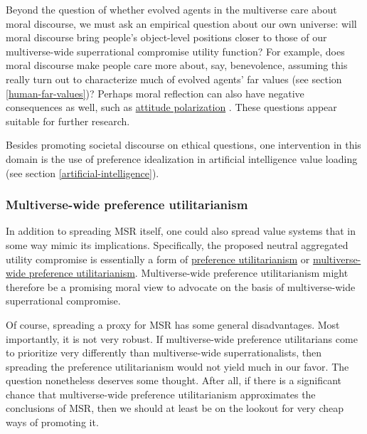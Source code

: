 Beyond the question of whether evolved agents in the multiverse care
about moral discourse, we must ask an empirical question about our own
universe: will moral discourse bring people's object-level positions
closer to those of our multiverse-wide superrational compromise utility
function? For example, does moral discourse make people care more about,
say, benevolence, assuming this really turn out to characterize much of
evolved agents' far values (see section
\ref{human-far-values})?
Perhaps moral reflection can also have negative consequences as well,
such as
\href{https://en.wikipedia.org/wiki/Group_polarization\#Attitude_polarization}{attitude
polarization} \parencite{Lord1979-sc,Taber2006-ew}. These
questions appear suitable for further research.

Besides promoting societal discourse on ethical questions, one
intervention in this domain is the use of preference idealization in
artificial intelligence value loading (see section
\ref{artificial-intelligence}).

\hypertarget{multiverse-wide-preference-utilitarianism}{\subsubsection{Multiverse-wide
preference
utilitarianism}\label{multiverse-wide-preference-utilitarianism}}

In addition to spreading MSR itself, one could also spread value systems
that in some way mimic its implications. Specifically, the proposed
neutral aggregated utility compromise 
is essentially a form of
\href{https://foundational-research.org/hedonistic-vs-preference-utilitarianism/}{preference
utilitarianism} or
\href{http://lesswrong.com/lw/jll/multiversewide_preference_utilitarianism/}{multiverse-wide
preference utilitarianism}. Multiverse-wide preference utilitarianism
might therefore be a promising moral view to advocate on the basis of
multiverse-wide superrational compromise.

Of course, spreading a proxy for MSR has some general disadvantages.
Most importantly, it is not very robust. If multiverse-wide preference
utilitarians come to prioritize very differently than multiverse-wide
superrationalists, then spreading the preference utilitarianism would
not yield much in our favor. The question nonetheless deserves some
thought. After all, if there is a significant chance that
multiverse-wide preference utilitarianism approximates the conclusions
of MSR, then we should at least be on the lookout for very cheap ways of
promoting it.


